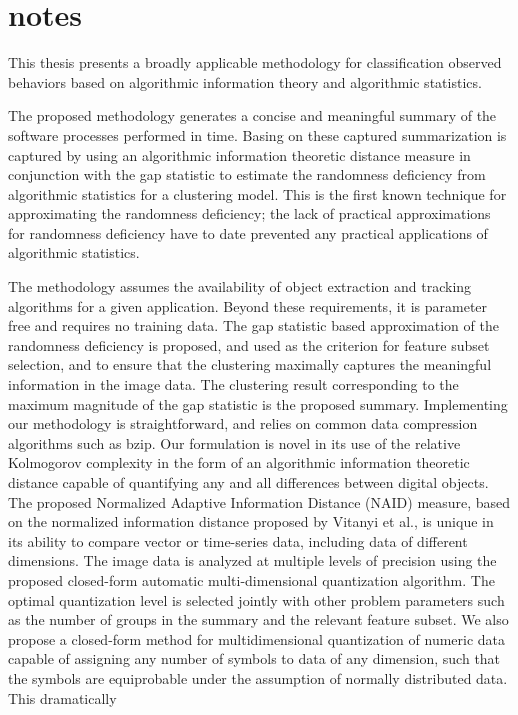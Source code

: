 \chapter{notes}

This thesis presents a broadly applicable methodology for classification observed 
behaviors based on algorithmic information theory and algorithmic statistics. 

The proposed methodology generates a concise and meaningful summary of the software 
processes performed in time. Basing on these captured summarization is captured by using an algorithmic information theoretic
distance measure in conjunction with the gap statistic to estimate the randomness
deficiency from algorithmic statistics for a clustering model. This is the first known
technique for approximating the randomness deficiency; the lack of practical
approximations for randomness deficiency have to date prevented any practical
applications of algorithmic statistics. 

The methodology assumes the availability of object extraction and tracking algorithms 
for a given application. Beyond these requirements, it
is parameter free and requires no training data. The gap statistic based approximation of
the randomness deficiency is proposed, and used as the criterion for feature subset
selection, and to ensure that the clustering maximally captures the meaningful
information in the image data. The clustering result corresponding to the maximum
magnitude of the gap statistic is the proposed summary. Implementing our methodology
is straightforward, and relies on common data compression algorithms such as bzip.
Our formulation is novel in its use of the relative Kolmogorov complexity in the form of
an algorithmic information theoretic distance capable of quantifying any and all
differences between digital objects. The proposed Normalized Adaptive Information
Distance (NAID) measure, based on the normalized information distance proposed by
Vitanyi et al., is unique in its ability to compare vector or time-series data, including
data of different dimensions. The image data is analyzed at multiple levels of precision
using the proposed closed-form automatic multi-dimensional quantization algorithm.
The optimal quantization level is selected jointly with other problem parameters such as
the number of groups in the summary and the relevant feature subset. We also propose a
closed-form method for multidimensional quantization of numeric data capable of
assigning any number of symbols to data of any dimension, such that the symbols are
equiprobable under the assumption of normally distributed data. This dramatically


